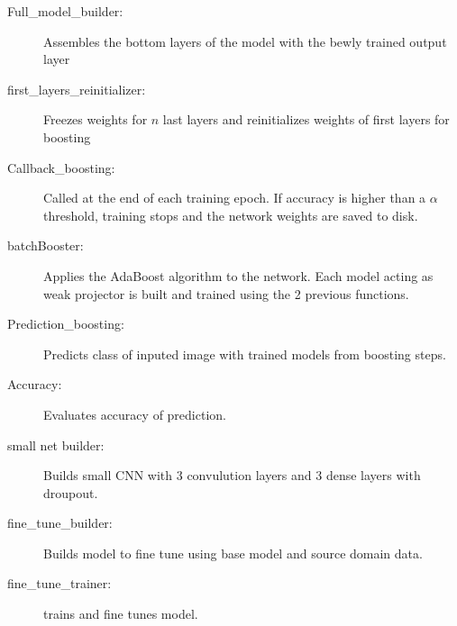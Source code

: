 \documentclass[11 pt]{article}
\begin{document}
\begin{appendices}
\begin{description}
    \item[Full\_model\_builder:] Assembles the bottom layers of the model with the bewly trained output layer
    \item[first\_layers\_reinitializer:] Freezes weights for \(n\) last layers and reinitializes weights of first layers for boosting
    \item[Callback\_boosting:] Called at the end of each training epoch. If accuracy is higher than a \(\alpha \) threshold, training stops and the network weights are saved to disk.
    \item[batchBooster:] Applies the AdaBoost algorithm to the network. Each model acting as weak projector is built and trained using the 2 previous functions.
    \item[Prediction\_boosting:] Predicts class of inputed image with trained models from boosting steps.
    \item[Accuracy:] Evaluates accuracy of prediction. 
    \item[small net builder:] Builds small CNN with 3 convulution layers and 3 dense layers with droupout. 
    \item[fine\_tune\_builder:] Builds model to fine tune using base model and source domain data. 
    \item[fine\_tune\_trainer:] trains and fine tunes model. 
  \end{description}
\end{appendices}
\end{document}
